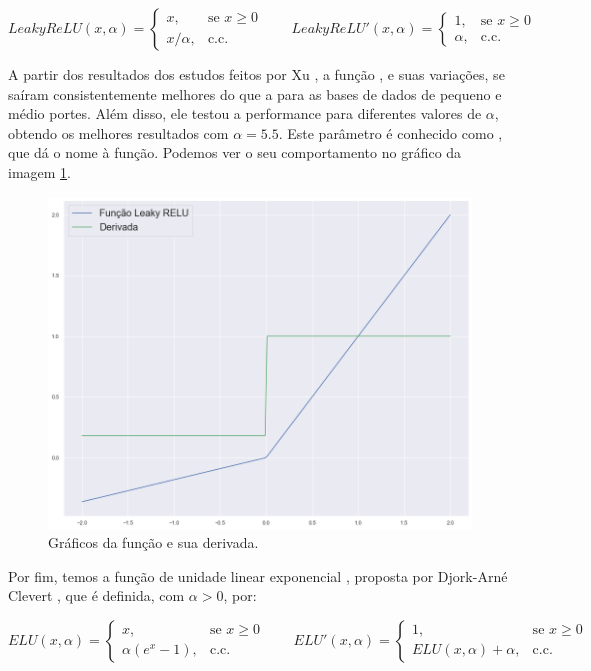 \[
LeakyReLU(x, \alpha) = 
\begin{cases}
    	x, & \text{se } x\ge 0\\
    	x/\alpha, & \text{c.c.}
	\end{cases}
\quad \quad  
LeakyReLU'(x, \alpha) =
	\begin{cases}
    	1, & \text{se } x\ge 0\\
    	\alpha, & \text{c.c.}
	\end{cases}
\]

A partir dos resultados dos estudos feitos por Xu \citep{xu_relu}, a função , e suas variações, se saíram consistentemente melhores do que a  para as bases de dados de pequeno e médio portes. Além disso, ele testou a performance para diferentes valores de $\alpha$, obtendo os melhores resultados com $\alpha = 5.5$. Este parâmetro é conhecido como , que dá o nome à função. Podemos ver o seu comportamento no gráfico da imagem \ref{fig:l_relu}.

\begin{figure}[htb]
\centering
\includegraphics[width=12cm]{figuras/l_relu}
\caption{Gráficos da função  e sua derivada.}
\label{fig:l_relu}
\end{figure}

Por fim, temos a função de unidade linear exponencial , proposta por Djork-Arné Clevert \citep{clevert}, que é definida, com $\alpha > 0$, por:

\[
ELU(x, \alpha)=
	\begin{cases}
    	x, & \text{se } x\ge 0\\
    	\alpha(e^x - 1), & \text{c.c.}
	\end{cases}
\quad \quad
ELU'(x, \alpha)=
	\begin{cases}
    	1, & \text{se } x\ge 0\\
    	ELU(x, \alpha)+\alpha, & \text{c.c.}
	\end{cases} 
\]

